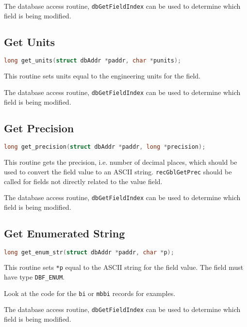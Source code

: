 The database access routine, \verb|dbGetFieldIndex| can be used to determine which field is being modified.

\subsection{Get Units}

\begin{lstlisting}[language=C]
long get_units(struct dbAddr *paddr, char *punits);
\end{lstlisting}

This routine sets units equal to the engineering units for the field.

The database access routine, \verb|dbGetFieldIndex| can be used to determine which field is being modified.

\subsection{Get Precision}

\begin{lstlisting}[language=C]
long get_precision(struct dbAddr *paddr, long *precision);
\end{lstlisting}

This routine gets the precision, i.e.
number of decimal places, which should be used to convert the field value to an ASCII string.
\verb|recGblGetPrec| should be called for fields not directly related to the value field.

The database access routine, \verb|dbGetFieldIndex| can be used to determine which field is being modified.

\subsection{Get Enumerated String}

\begin{lstlisting}[language=C]
long get_enum_str(struct dbAddr *paddr, char *p);
\end{lstlisting}

This routine sets \verb|*p| equal to the ASCII string for the field value.
The field must have type \verb|DBF_ENUM|.

Look at the code for the \verb|bi| or \verb|mbbi| records for examples.

The database access routine, \verb|dbGetFieldIndex| can be used to determine which field is being modified.

